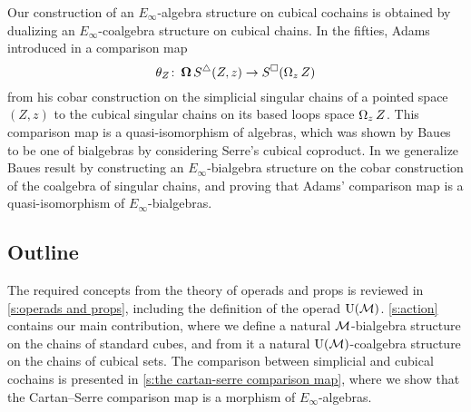 Our construction of an $E_\infty$-algebra structure on cubical cochains is obtained by dualizing an $E_\infty$-coalgebra structure on cubical chains.
In the fifties, Adams introduced in \cite{adams1956cobar} a comparison map
\[
\theta_Z \colon \operatorname{\mathbf{\Omega}} S^\triangle(Z,z) \to S^\square(\operatorname{\Omega}_z Z)
\]
from his cobar construction on the simplicial singular chains of a pointed space $(Z, z)$ to the cubical singular chains on its based loops space $\operatorname{\Omega}_z Z$.
This comparison map is a quasi-isomorphism of algebras, which was shown by Baues \cite{baues1998hopf} to be one of bialgebras by considering Serre's cubical coproduct.
In \cite{medina2021cobar} we generalize Baues result by constructing an $E_{\infty}$-bialgebra structure on the cobar construction of the coalgebra of singular chains, and proving that Adams' comparison map is a quasi-isomorphism of $E_{\infty}$-bialgebras.

\subsection*{Outline}

The required concepts from the theory of operads and props is reviewed in \cref{s:operads and props}, including the definition of the operad ${\operatorname{U}(\mathcal{M})}$.
\cref{s:action} contains our main contribution, where we define a natural $\mathcal{M}$-bialgebra structure on the chains of standard cubes, and from it a natural ${\operatorname{U}(\mathcal{M})}$-coalgebra structure on the chains of cubical sets.
The comparison between simplicial and cubical cochains is presented in \cref{s:the cartan-serre comparison map}, where we show that the Cartan--Serre comparison map is a morphism of $E_\infty$-algebras.
